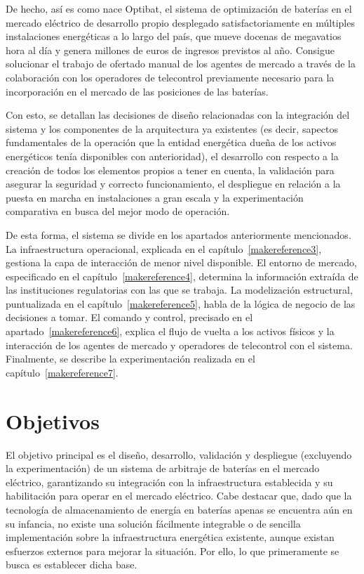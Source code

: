De hecho, así es como nace Optibat, el sistema de optimización de baterías en el mercado eléctrico de desarrollo propio desplegado satisfactoriamente en múltiples instalaciones energéticas a lo largo del país, que mueve docenas de megavatios hora al día y genera millones de euros de ingresos previstos al año. Consigue solucionar el trabajo de ofertado manual de los agentes de mercado a través de la colaboración con los operadores de telecontrol previamente necesario para la incorporación en el mercado de las posiciones de las baterías.

Con esto, se detallan las decisiones de diseño relacionadas con la integración del sistema y los componentes de la arquitectura ya existentes (es decir, sapectos fundamentales de la operación que la entidad energética dueña de los activos energéticos tenía disponibles con anterioridad), el desarrollo con respecto a la creación de todos los elementos propios a tener en cuenta, la validación para asegurar la seguridad y correcto funcionamiento, el despliegue en relación a la puesta en marcha en instalaciones a gran escala y la experimentación comparativa en busca del mejor modo de operación.

De esta forma, el sistema se divide en los apartados anteriormente mencionados. La infraestructura operacional, explicada en el capítulo~\ref{makereference3}, gestiona la capa de interacción de menor nivel disponible. El entorno de mercado, especificado en el capítulo~\ref{makereference4}, determina la información extraída de las instituciones regulatorias con las que se trabaja. La modelización estructural, puntualizada en el capítulo~\ref{makereference5}, habla de la lógica de negocio de las decisiones a tomar. El comando y control, precisado en el apartado~\ref{makereference6}, explica el flujo de vuelta a los activos físicos y la interacción de los agentes de mercado y operadores de telecontrol con el sistema. Finalmente, se describe la experimentación realizada en el capítulo~\ref{makereference7}.

\section{Objetivos}
\label{makereference1.1}

El objetivo principal es el diseño, desarrollo, validación y despliegue (excluyendo la experimentación) de un sistema de arbitraje de baterías en el mercado eléctrico, garantizando su integración con la infraestructura establecida y su habilitación para operar en el mercado eléctrico. Cabe destacar que, dado que la tecnología de almacenamiento de energía en baterías apenas se encuentra aún en su infancia, no existe una solución fácilmente integrable o de sencilla implementación sobre la infraestructura energética existente, aunque existan esfuerzos externos para mejorar la situación. Por ello, lo que primeramente se busca es establecer dicha base.

